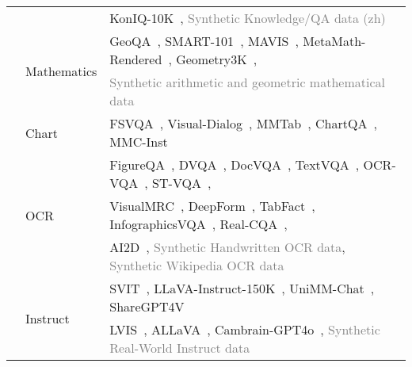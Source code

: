 \begin{table}[!ht]
{\begin{tabular}{c | l | l }
            & & KonIQ-10K~\citep{koniq10k}, \textcolor{gray}{Synthetic Knowledge/QA data (zh)} \\
     \cmidrule(lr){2-3} & \multirow{2}{*}{Mathematics} &  
            GeoQA~\citep{chen2021geoqa}, SMART-101~\citep{cherian2023smart101}, MAVIS~\citep{zhang2024mavis}, MetaMath-Rendered~\citep{yu2024metamath}, Geometry3K~\cite{lu2021inter}, \\
            & & \textcolor{gray}{Synthetic arithmetic and geometric mathematical data} \\
     \cmidrule(lr){2-3} & Chart &  
            FSVQA~\citep{shin2016fsvqa}, Visual-Dialog~\citep{das2017visualdialog}, MMTab~\citep{zheng2024multimodaltableunderstanding}, ChartQA~\citep{masry2022chartqa}, MMC-Inst~\cite{liu2024mmc}\\
     \cmidrule(lr){2-3} & \multirow{3}{*}{OCR} & 
            FigureQA~\citep{kahou2017figureqa}, DVQA~\citep{kafle2018dvqa}, DocVQA~\citep{mathew2021docvqa}, TextVQA~\citep{singh2019textvqa}, OCR-VQA~\citep{mishra2019ocrvqa}, ST-VQA~\citep{biten2019stvqa}, \\
            &  & VisualMRC~\citep{tanaka2021visualmrc}, DeepForm~\citep{deepform}, TabFact~\citep{chen2019tabfact}, InfographicsVQA~\citep{mathew2022infographicvqa}, Real-CQA~\citep{ahmed2023realcqa}, \\
            &  & AI2D~\citep{kembhavi2016ai2d}, \textcolor{gray}{Synthetic Handwritten OCR data}, \textcolor{gray}{Synthetic Wikipedia OCR data}  \\
     \cmidrule(lr){2-3} & \multirow{2}{*}{Instruct} & 
            SVIT~\citep{zhao2023svit}, LLaVA-Instruct-150K~\citep{liu2023llava}, UniMM-Chat~\citep{yu2023unimm}, ShareGPT4V~\citep{chen2023sharegpt4v} \\
            &  & LVIS~\citep{gupta2019lvis}, ALLaVA~\citep{chen2024allava}, Cambrain-GPT4o~\citep{tong2024cambrian}, \textcolor{gray}{Synthetic Real-World Instruct data}\\
    \bottomrule
    \end{tabular}}
\end{table}